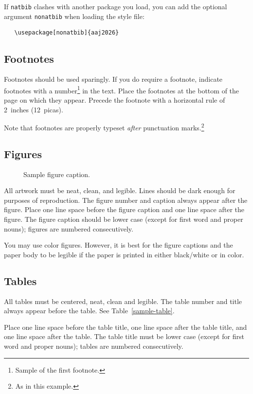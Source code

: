 \documentclass{article}
\begin{document}
If \verb+natbib+ clashes with another package you load, you can add the optional
argument \verb+nonatbib+ when loading the style file:
\begin{verbatim}
   \usepackage[nonatbib]{aaj2026}
\end{verbatim}



\subsection{Footnotes}


Footnotes should be used sparingly.  If you do require a footnote, indicate
footnotes with a number\footnote{Sample of the first footnote.} in the
text. Place the footnotes at the bottom of the page on which they appear.
Precede the footnote with a horizontal rule of 2~inches (12~picas).


Note that footnotes are properly typeset \emph{after} punctuation
marks.\footnote{As in this example.}


\subsection{Figures}


\begin{figure}
  \centering
  \fbox{\rule[-.5cm]{0cm}{4cm} \rule[-.5cm]{4cm}{0cm}}
  \caption{Sample figure caption.}
\end{figure}


All artwork must be neat, clean, and legible. Lines should be dark enough for
purposes of reproduction. The figure number and caption always appear after the
figure. Place one line space before the figure caption and one line space after
the figure. The figure caption should be lower case (except for first word and
proper nouns); figures are numbered consecutively.


You may use color figures.  However, it is best for the figure captions and the
paper body to be legible if the paper is printed in either black/white or in
color.


\subsection{Tables}


All tables must be centered, neat, clean and legible.  The table number and
title always appear before the table.  See Table~\ref{sample-table}.


Place one line space before the table title, one line space after the
table title, and one line space after the table. The table title must
be lower case (except for first word and proper nouns); tables are
numbered consecutively.
\end{document}
